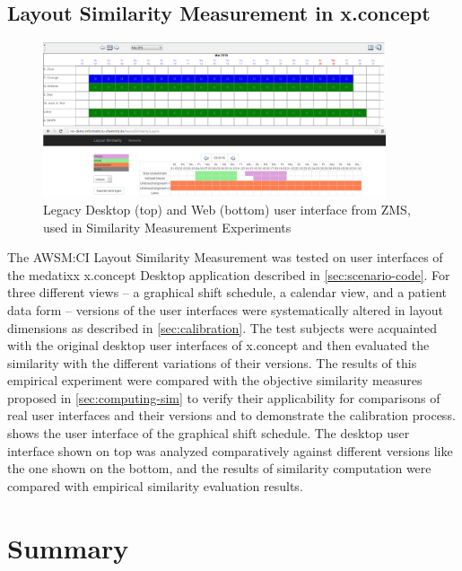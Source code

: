 \subsection{Layout Similarity Measurement in x.concept}
\vspace{10pt}

\begin{figure}[h!]
\hypertarget{fig:eval.similarity}{%
\centering
\includegraphics[width=0.9\textwidth]{../figures/zms.png}
\caption[ZMS Legacy and Web User Interfaces]{Legacy Desktop (top) and Web (bottom) user interface from ZMS, \\ used in Similarity Measurement Experiments}\label{fig:eval.similarity}
}
\end{figure}
The AWSM:CI Layout Similarity Measurement was tested on user interfaces of the medatixx x.concept Desktop application described in \cref{sec:scenario-code}.
For three different views -- a graphical shift schedule, a calendar view, and a patient data form -- \web versions of the user interfaces were systematically altered in layout dimensions as described in \cref{sec:calibration}.
The test subjects were acquainted with the original desktop user interfaces of x.concept and then evaluated the similarity with the different variations of their \web versions.
The results of this empirical experiment were compared with the objective similarity measures proposed in \cref{sec:computing-sim} to verify their applicability for comparisons of real \legacy user interfaces and their \web versions and to demonstrate the calibration process.
 shows the user interface of the graphical shift schedule.
The \legacy desktop user interface shown on top was analyzed comparatively against different \webbased versions like the one shown on the bottom, and the results of similarity computation were compared with empirical similarity evaluation results.

\vspace{-15pt}
\hypertarget{sec:evaluation.summary}{%
\section{Summary}\label{sec:evaluation.summary}}
\vspace{15pt}

